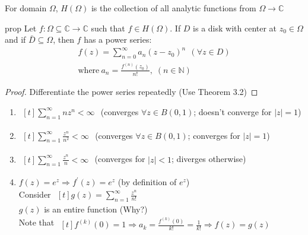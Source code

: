 \begin{defn}
For domain $\Omega$, $H(\Omega)$ is the collection of all analytic functions from $\Omega \rightarrow \mathds{C}$
\end{defn}
\begin{restatable}[]{prop}{}\label{}
Let $f:\Omega\subseteq \mathds{C} \rightarrow \mathds{C}$ such that $f\in H(\Omega)$. If $D$ is a disk with center at $z_0\in \Omega$ and if $\bar{D}\subseteq \Omega$, then $f$ has a power series:
\begin{align}
f(z)=\sum_{n=0}^{\infty} a_n(z-z_0)^n \:\:(\forall z\in D) \nonumber\\
\text{where}\: a_n=\frac{f^{(n)}(z_0)}{n!}\text{,}\:\: (n\in \mathds{N})\nonumber
\end{align}
\end{restatable}
\begin{proof}
Differentiate the power series repeatedly (Use Theorem 3.2)
\end{proof}
\begin{ex}
\begin{enumerate}
\item $\begin{aligned}[t] \sum_{n=1}^{\infty} nz^n <\infty \end{aligned}$ \: (converges $\forall z \in B(0,1)$; doesn't converge for $|z|=1$) 
\item $\begin{aligned}[t] \sum_{n=1}^{\infty} \frac{z^n}{n^2} <\infty \end{aligned}$ \:(converges $\forall z\in B(0,1)$; converges for $|z|=1$)
\item $\begin{aligned}[t] \sum_{n=1}^{\infty} \frac{z^n}{n} <\infty \end{aligned}$ \:(converges for $|z|<1$; diverges otherwise)
\item $f(z)=e^z \Rightarrow f^{'}(z)=e^z$ (by definition of $e^z$)\\
Consider $\begin{aligned}[t] g(z)=\sum_{n=1}^{\infty} \frac{z^n}{n!}\end{aligned}$ \\
$g(z)$ is an entire function (Why?)\\
Note that $\begin{aligned}[t] f^{(k)}(0)=1\Rightarrow a_k=\frac{f^{(k)}(0)}{k!}=\frac{1}{k!}\Rightarrow f(z)=g(z) \end{aligned}$
\end{enumerate}
\end{ex}